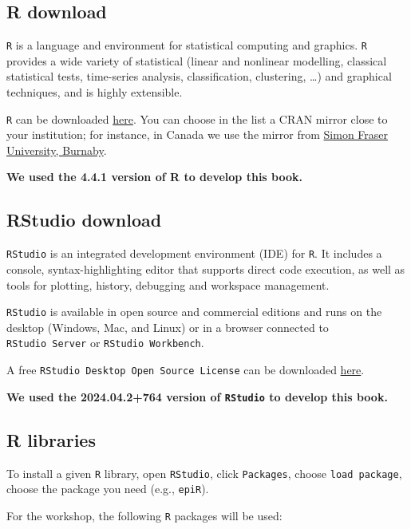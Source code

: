 \documentclass[
]{book}
\begin{document}
\subsection{R download}\label{r-download}

\texttt{R} is a language and environment for statistical computing and graphics. \texttt{R} provides a wide variety of statistical (linear and nonlinear modelling, classical statistical tests, time-series analysis, classification, clustering, \ldots) and graphical techniques, and is highly extensible.

\texttt{R} can be downloaded \href{https://cran.r-project.org/mirrors.html}{here}. You can choose in the list a CRAN mirror close to your institution; for instance, in Canada we use the mirror from \href{https://mirror.rcg.sfu.ca/mirror/CRAN/}{Simon Fraser University, Burnaby}.

\textbf{We used the 4.4.1 version of R to develop this book.}

\subsection{RStudio download}\label{rstudio-download}

\texttt{RStudio} is an integrated development environment (IDE) for \texttt{R}. It includes a console, syntax-highlighting editor that supports direct code execution, as well as tools for plotting, history, debugging and workspace management.

\texttt{RStudio} is available in open source and commercial editions and runs on the desktop (Windows, Mac, and Linux) or in a browser connected to \texttt{RStudio\ Server} or \texttt{RStudio\ Workbench}.

A free \texttt{RStudio\ Desktop\ Open\ Source\ License} can be downloaded \href{https://www.rstudio.com/products/rstudio/download/}{here}.

\textbf{We used the 2024.04.2+764 version of \texttt{RStudio} to develop this book.}

\subsection{R libraries}\label{r-libraries}

To install a given \texttt{R} library, open \texttt{RStudio}, click \texttt{Packages}, choose \texttt{load\ package}, choose the package you need (e.g., \texttt{epiR}).

For the workshop, the following \texttt{R} packages will be used:
\end{document}
